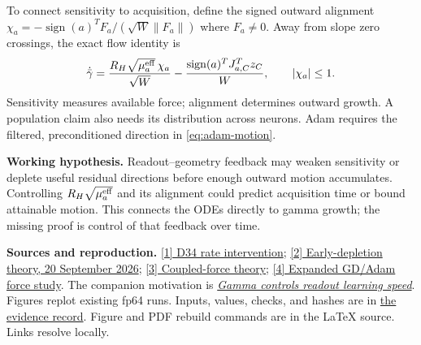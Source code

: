 \documentclass[10pt]{article}
\DeclareMathOperator{\sign}{sign}
\begin{document}
To connect sensitivity to acquisition, define the signed outward alignment
$\chi_a=-\sign(a)^TF_a/(\sqrt W\|F_a\|)$ where $F_a\ne0$.
Away from slope zero crossings, the exact flow identity is
\begin{equation}\label{eq:outward}
 \dot{\bar\gamma}
 =\frac{R_H\sqrt{\mu_a^{\rm eff}}\,\chi_a}{\sqrt W}
  -\frac{\sign(a)^TJ_{a,C}^Tz_C}{W},\qquad |\chi_a|\le1.
\end{equation}
Sensitivity measures available force; alignment determines outward growth.
A population claim also needs its distribution across neurons. Adam requires
the filtered, preconditioned direction in \eqref{eq:adam-motion}.

\textbf{Working hypothesis.}
Readout--geometry feedback may weaken sensitivity or deplete useful residual
directions before enough outward motion accumulates. Controlling
$R_H\sqrt{\mu_a^{\rm eff}}$ and its alignment could predict acquisition time
or bound attainable motion. This connects the ODEs directly to gamma growth;
the missing proof is control of that feedback over time.

\vspace{2pt}
{\footnotesize
\textbf{Sources and reproduction.}
\href{run:../results/checkpoint_D_optimizers/expD34_readout_race/REPORT.md}{[1] D34 rate intervention};
\href{run:readout_driven_slope_signal_depletion.md}{[2] Early-depletion theory, 20 September 2026};
\href{run:d34_transport_scale_barrier.md}{[3] Coupled-force theory};
\href{run:../results/checkpoint_D_optimizers/expD34_readout_race/adam_force_extension/README.md}{[4] Expanded GD/Adam force study}.
The companion motivation is
\href{run:../../precision-mlps-frozen-gamma-probe/docs/gamma_optimization_pi_brief.pdf}{\emph{Gamma controls readout learning speed}}.
Figures replot existing fp64 runs. Inputs, values, checks, and hashes are in
\href{run:assets/gamma_scale_acquisition_pi_brief/evidence.json}{the evidence record}.
Figure and PDF rebuild commands are in the LaTeX source. Links resolve locally.
}
\end{document}
